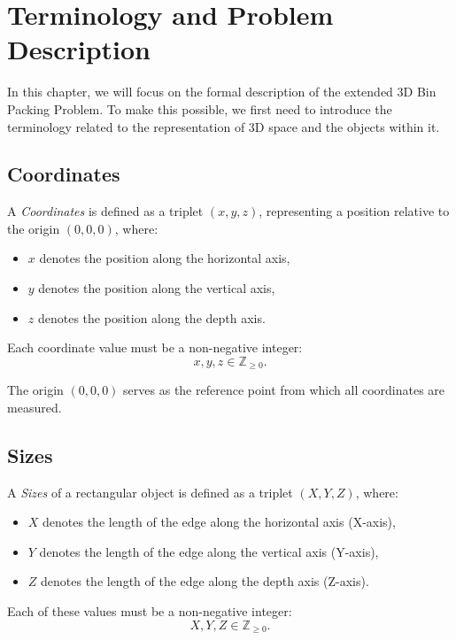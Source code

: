 \chapter{Terminology and Problem Description}
\label{chap:problem}

In this chapter, we will focus on the formal description of the extended 3D Bin Packing Problem.
To make this possible, we first need to introduce the terminology related to the representation of 3D space and the objects within it.



\section{Coordinates}

A \textit{Coordinates} is defined as a triplet $(x, y, z)$, representing a position relative to the origin $(0, 0, 0)$, where:
\begin{itemize}
    \item $x$ denotes the position along the horizontal axis,
    \item $y$ denotes the position along the vertical axis,
    \item $z$ denotes the position along the depth axis.
\end{itemize}

Each coordinate value must be a non-negative integer:
\[
x, y, z \in \mathbb{Z}_{\geq 0}.
\]

The origin $(0, 0, 0)$ serves as the reference point from which all coordinates are measured.



\section{Sizes}

A \textit{Sizes} of a rectangular object is defined as a triplet $(X, Y, Z)$, where:

\begin{itemize}
    \item $X$ denotes the length of the edge along the horizontal axis (X-axis),
    \item $Y$ denotes the length of the edge along the vertical axis (Y-axis),
    \item $Z$ denotes the length of the edge along the depth axis (Z-axis).
\end{itemize}

Each of these values must be a non-negative integer:
\[
X, Y, Z \in \mathbb{Z}_{\geq 0}.
\]




